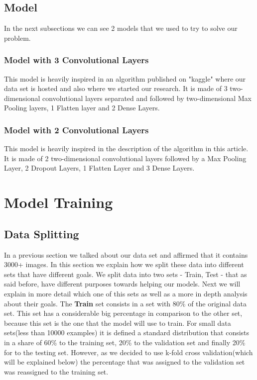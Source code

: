 \documentclass[conference]{IEEEtran}
\newcommand\tab[1][0.4cm]{\hspace*{#1}}
\begin{document}
\subsection{Model} In the next subsections we can see 2 models that we used to try to solve our problem.

\subsubsection{Model with 3 Convolutional Layers}
This model is heavily inspired in an algorithm published on "kaggle"\cite{S} where our data set is hosted and also where we started our research. It is made of 3 two-dimensional convolutional layers separated and followed by two-dimensional Max Pooling layers, 1 Flatten layer and 2 Dense Layers.

\subsubsection{Model with 2 Convolutional Layers}
This model is heavily inspired in the description of the algorithm in this article\cite{M}. It is made of 2 two-dimensional convolutional layers followed by a Max Pooling Layer, 2 Dropout Layers, 1 Flatten Layer and 3 Dense Layers.

\section{Model Training}
\subsection{Data Splitting}

In a previous section we talked about our data set and affirmed that it contains 3000+ images. In this section we explain how we split these data into different sets that have different goals. We split data into two sets - Train, Test - that as said before, have different purposes towards helping our models. Next we will explain in more detail which one of this sets as well as a more in depth analysis about their goals.
\linebreak
\tab The \textbf{Train} set consists in a set with 80\% of the original data set. This set has a considerable big percentage in comparison to the other set, because this set is the one that the model will use to train. For small data sets(less than 10000 examples) it is defined a standard distribution that consists in a share of 60\% to the training set, 20\% to the validation set and finally 20\% for to the testing set. However, as we decided to use k-fold cross validation(which will be explained below) the percentage that was assigned to the validation set was reassigned to the training set.
\end{document}

